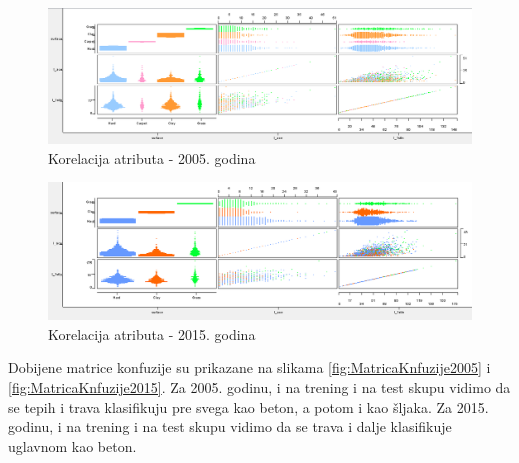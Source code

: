 \documentclass[a4paper]{article}
\begin{document}
\begin{figure}[H]
	\begin{center}
		\includegraphics[width=\textwidth]{Klasifikacija/DrvoOdlucivanja/2005/KorelacijaAsInSurface.png}
	\end{center}
	\caption{ Korelacija atributa - 2005. godina}
	\label{fig:KlasifikacijaScatterMatrix2005}
\end{figure}
\restoregeometry
\begin{figure}[H]
	\begin{center}
		\includegraphics[width=\textwidth]{Klasifikacija/DrvoOdlucivanja/2015/KorelacijaAsInSurface.png}
	\end{center}
	\caption{ Korelacija atributa - 2015. godina}
	\label{fig:KlasifikacijaScatterMatrix2015}
\end{figure}

Dobijene matrice konfuzije su prikazane na slikama \ref{fig:MatricaKnfuzije2005} i \ref{fig:MatricaKnfuzije2015}.
Za 2005. godinu, i na trening i na test skupu vidimo da se tepih i trava klasifikuju pre svega kao beton, a potom i kao šljaka.
Za 2015. godinu, i na trening i na test skupu vidimo da se trava i dalje klasifikuje uglavnom kao beton.
\end{document}
